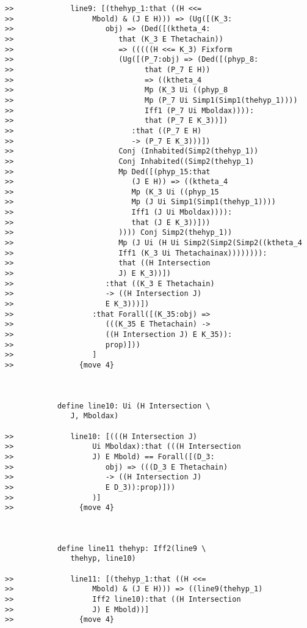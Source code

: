 \documentclass[12pt]{article}
\begin{document}
\begin{verbatim}
>>             line9: [(thehyp_1:that ((H <<=
>>                  Mbold) & (J E H))) => (Ug([(K_3:
>>                     obj) => (Ded([(ktheta_4:
>>                        that (K_3 E Thetachain))
>>                        => (((((H <<= K_3) Fixform
>>                        (Ug([(P_7:obj) => (Ded([(phyp_8:
>>                              that (P_7 E H))
>>                              => ((ktheta_4
>>                              Mp (K_3 Ui ((phyp_8
>>                              Mp (P_7 Ui Simp1(Simp1(thehyp_1))))
>>                              Iff1 (P_7 Ui Mboldax)))):
>>                              that (P_7 E K_3))])
>>                           :that ((P_7 E H)
>>                           -> (P_7 E K_3)))])
>>                        Conj (Inhabited(Simp2(thehyp_1))
>>                        Conj Inhabited((Simp2(thehyp_1)
>>                        Mp Ded([(phyp_15:that
>>                           (J E H)) => ((ktheta_4
>>                           Mp (K_3 Ui ((phyp_15
>>                           Mp (J Ui Simp1(Simp1(thehyp_1))))
>>                           Iff1 (J Ui Mboldax)))):
>>                           that (J E K_3))]))
>>                        )))) Conj Simp2(thehyp_1))
>>                        Mp (J Ui (H Ui Simp2(Simp2(Simp2((ktheta_4
>>                        Iff1 (K_3 Ui Thetachainax)))))))):
>>                        that ((H Intersection
>>                        J) E K_3))])
>>                     :that ((K_3 E Thetachain)
>>                     -> ((H Intersection J)
>>                     E K_3)))])
>>                  :that Forall([(K_35:obj) =>
>>                     (((K_35 E Thetachain) ->
>>                     ((H Intersection J) E K_35)):
>>                     prop)]))
>>                  ]
>>               {move 4}



            define line10: Ui (H Intersection \
               J, Mboldax)

>>             line10: [(((H Intersection J)
>>                  Ui Mboldax):that (((H Intersection
>>                  J) E Mbold) == Forall([(D_3:
>>                     obj) => (((D_3 E Thetachain)
>>                     -> ((H Intersection J)
>>                     E D_3)):prop)]))
>>                  )]
>>               {move 4}



            define line11 thehyp: Iff2(line9 \
               thehyp, line10)

>>             line11: [(thehyp_1:that ((H <<=
>>                  Mbold) & (J E H))) => ((line9(thehyp_1)
>>                  Iff2 line10):that ((H Intersection
>>                  J) E Mbold))]
>>               {move 4}




\end{verbatim}
\end{document}
